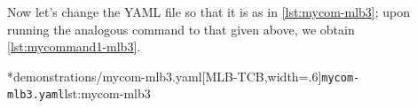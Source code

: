 	Now let's change the YAML file so that it is as in \cref{lst:mycom-mlb3}; upon running
	the analogous command to that given above, we obtain \cref{lst:mycommand1-mlb3}.

        \begin{cmhtcbraster}[
            raster force size=false,
            raster column 1/.style={add to width=-1cm},
           ]
		\cmhlistingsfromfile[style=yaml-LST]*{demonstrations/mycom-mlb3.yaml}[MLB-TCB,width=.6\textwidth]{\texttt{mycom-mlb3.yaml}}{lst:mycom-mlb3}
        \end{cmhtcbraster}
